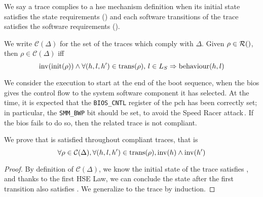 We say a trace complies to a \ac{hse} mechanism definition when its initial
state satisfies the state requirements () and each software
transitions of the trace satisfies the software requirements ().
%
\begin{definition}
  We write $\mathcal{C}(\Delta)$ for the set of the traces which comply with
  $\Delta$.
  Given $\rho \in \pathesLTS{Ez}$, then $\rho \in \mathcal{C}(\Delta)$ iff
  \[
    \mathrm{inv}(\mathrm{init}(\rho)) \wedge \forall (h,l,h') \in
    \mathrm{trans}(\rho)\text{, }l \in L_S \Rightarrow \mathrm{behaviour}(h, l)
  \]
\end{definition}

\begin{example}
  We consider the execution to start at the end of the boot sequence, when the
  \ac{bios} gives the control flow to the system software component it has
  selected.
  At the time, it is expected that the \texttt{BIOS\_CNTL} register of the
  \ac{pch} has been correctly set; in particular, the \texttt{SMM\_BWP} bit
  should be set, to avoid the Speed Racer
  attack\,\cite{kallenberg2015racecondition}.
  If the \ac{bios} fails to do so, then the related trace is not compliant.
\end{example}

\begin{lemma}
  We prove that  is satisfied throughout compliant traces, that is
  \[
    \forall \rho \in \mathcal{C}(\Delta), \forall (h, l, h') \in
    \mathrm{trans}(\rho), \mathrm{inv}(h) \wedge \mathrm{inv}(h')
  \]

  \begin{proof}
    \label{lemma:speccert:invariant}
    By definition of $\mathcal{C}(\Delta)$, we know the initial state of the
    trace satisfies , and thanks to the first HSE Law, we can conclude
    the state after the first transition also satisfies .
    We generalize to the trace by induction.
  \end{proof}
\end{lemma}

